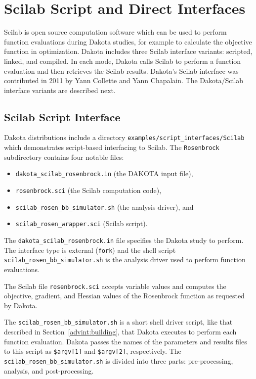 \section{Scilab Script and Direct Interfaces}\label{scilab}

Scilab is open source computation software which can be used to
perform function evaluations during Dakota studies, for example to
calculate the objective function in optimization.  Dakota includes
three Scilab interface variants: scripted, linked, and compiled.  In
each mode, Dakota calls Scilab to perform a function evaluation and
then retrieves the Scilab results.  Dakota's Scilab interface was
contributed in 2011 by Yann Collette and Yann Chapalain.  The
Dakota/Scilab interface variants are described next.

\subsection{Scilab Script Interface} 

Dakota distributions include a directory
\texttt{examples/script\_interfaces/Scilab} which demonstrates
script-based interfacing to Scilab.  The {\tt Rosenbrock} subdirectory
contains four notable files:
\begin{itemize}
  \item \texttt{dakota\_scilab\_rosenbrock.in} (the DAKOTA input file),
  \item \texttt{rosenbrock.sci} (the Scilab computation code),
  \item \texttt{scilab\_rosen\_bb\_simulator.sh} (the analysis driver), and
  \item \texttt{scilab\_rosen\_wrapper.sci} (Scilab script).
\end{itemize}

The \texttt{dakota\_scilab\_rosenbrock.in} file specifies the Dakota
study to perform.  The interface type is external ({\tt fork}) and the
shell script \texttt{scilab\_rosen\_bb\_simulator.sh} is the analysis
driver used to perform function evaluations.

The Scilab file \texttt{rosenbrock.sci} accepts variable values and
computes the objective, gradient, and Hessian values of the Rosenbrock
function as requested by Dakota.

The \texttt{scilab\_rosen\_bb\_simulator.sh} is a short shell driver
script, like that described in Section~\ref{advint:building}, that
Dakota executes to perform each function evaluation. Dakota passes
the names of the parameters and results files to this script as
\texttt{\$argv[1]} and \texttt{\$argv[2]}, respectively. The
\texttt{scilab\_rosen\_bb\_simulator.sh} is divided into three parts:
pre-processing, analysis, and post-processing.

